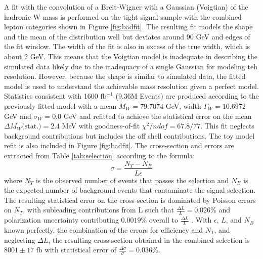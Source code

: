 A fit with the convolution of a Breit-Wigner with a Gaussian (Voigtian) of the hadronic W mass is performed on the tight signal sample with the combined lepton categories shown in Figure \ref{fig:badfit}. The resulting fit models the shape and the mean of the distribution well but deviates around 90 GeV and edges of the fit window. The width of the fit is also in excess of the true width, which is about 2 GeV. This means that the Voigtian model is inadequate in describing  the simulated data likely due to the inadequacy of a single Gaussian for modeling teh resolution. However, because the shape is similar to simulated data, the fitted model is used to understand the achievable mass resolution given a perfect model. Statistics consistent with 1600 $\text{fb}^{-1}$ (9.36M Events) are produced according to the previously fitted model with a mean  $M_W = 79.7074$ GeV, width $\Gamma_W = 10.6972$ GeV and $\sigma_W = 0.0$ GeV and refitted to achieve the statistical error on the mean $\Delta M_W \text{(stat.)} = 2.4$ MeV with goodness-of-fit $\chi^2 / ndof = 67.8/77$. This fit neglects background contributions but includes the off shell contributions. The toy model refit is also included in Figure \ref{fig:badfit}.
The cross-section and errors are extracted from Table \ref{tab:selection} according to the formula:
\begin{equation}
\sigma = \frac{N_T - N_B}{L \epsilon}
\end{equation}
where $N_T$ is the observed number of events that passes the selection and $N_B$ is the expected number of background events that contaminate the signal selection. The resulting statistical error on the cross-section is dominated by  Poisson errors on $N_T$, with subleading contributions from L such that $\frac{\Delta L}{L} = 0.026 \%$ and polarization uncertainty contributing $0.0019\%$ overall to $\frac{\Delta L}{L}$ \cite{ilcluminosity}. With $\epsilon$, $L$, and $N_B$ known perfectly, the combination of the errors for efficiency and $N_T$, and neglecting $\Delta L$, the resulting cross-section obtained in the combined selection is $8001 \pm 17 \, \, \text{fb}$ with statistical error of $\frac{\Delta \sigma}{\sigma} = 0.036 \%$. 
